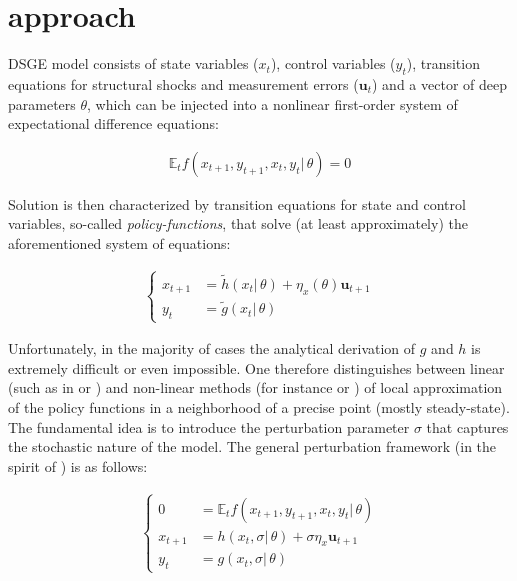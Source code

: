 \documentclass{pracamgr}
\numberwithin{equation}{section}
\begin{document}
\section{\citet{klein2000using} approach}

DSGE model consists of state variables ($x_{t}$), control variables ($y_{t}$), transition equations for structural shocks and measurement errors ($ \mathbf{u}_{t}$) and a vector of deep parameters $\theta$, which can be injected into a nonlinear first-order system of expectational difference equations:

\begin{align}
\mathbb{E}_{t}f\left(x_{t+1},y_{t+1},x_{t},y_{t} | \, \theta \right) = 0
\end{align}

Solution is then characterized by transition equations for state and control variables, so-called \textit{policy-functions}, that solve (at least approximately) the aforementioned system of equations:

\begin{align}
\left\{
\begin{array}{cl}
x_{t+1} &= \widetilde{h} \left( x_{t} | \, \theta \right) + \eta_{x} \left( \theta \right) \mathbf{u}_{t+1} \\
y_{t} &= \widetilde{g} \left( x_{t} | \, \theta \right)
\end{array}
\right.
\end{align}

Unfortunately, in the majority of cases the analytical derivation of $g$ and $h$ is extremely difficult or even impossible. One therefore distinguishes between linear (such as in \citet{klein2000using} or \citet{sims2002solving}) and non-linear methods (for instance \citet{schmitt2004solving} or \citet{gomme2011second}) of local approximation of the policy functions in a neighborhood of a precise point (mostly steady-state). The fundamental idea is to introduce the perturbation parameter $\sigma$ that captures the stochastic nature of the model. The general perturbation framework (in the spirit of \citet{schmitt2004solving}) is as follows:

\begin{align}
\left\{
\begin{array}{cl}
0 &= \mathbb{E}_{t}f\left(x_{t+1},y_{t+1},x_{t},y_{t} | \, \theta \right) \\
x_{t+1} &= h \left( x_{t}, \sigma | \, \theta \right) + \sigma \eta_{x} \mathbf{u}_{t+1} \\
y_{t} &= g \left( x_{t}, \sigma | \, \theta \right)
\end{array}
\right.
\end{align}
\end{document}
